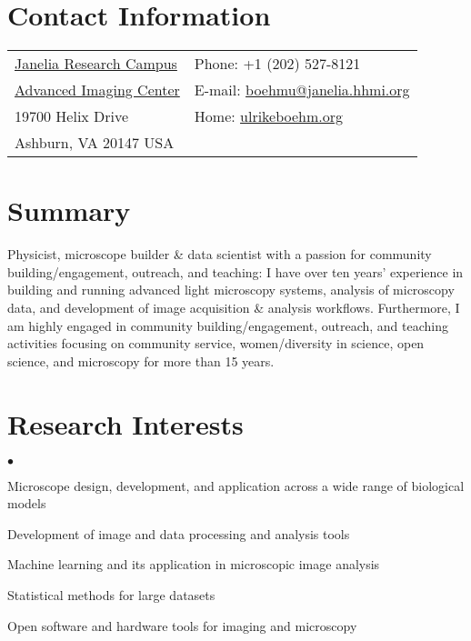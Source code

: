 \documentclass[margin,line]{res}
\newenvironment{list2}{
  \begin{list}{$\bullet$}{%
      \setlength{\itemsep}{0in}
      \setlength{\parsep}{0in} \setlength{\parskip}{0in}
      \setlength{\topsep}{0in} \setlength{\partopsep}{0in} 
      \setlength{\leftmargin}{0.2in}}}{\end{list}}
\begin{document}


\begin{resume}


\section{\sc Contact Information}
\vspace{.05in}
\begin{tabular}{@{}p{3.5in}p{4in}}
 \href{https://www.janelia.org/}{Janelia Research Campus}     & {Phone:} +1 (202) 527-8121 \\            
 \href{https://www.aicjanelia.org/}{Advanced Imaging Center}   & { E-mail:}   \href{mailto:boehmu@janelia.hhmi.org}{boehmu@janelia.hhmi.org}  \\         
19700 Helix Drive & { Home:}  \href{http://ulrikeboehm.org/}{ulrikeboehm.org}\\       
Ashburn, VA  20147 USA  &  \\     
\end{tabular}


\section{\sc Summary}
Physicist, microscope builder \& data scientist with a passion for community building/engagement, outreach, and teaching: I have over ten years’ experience in building and running advanced light microscopy systems, analysis of microscopy data, and development of image acquisition \& analysis workflows. Furthermore, I am highly engaged in community building/engagement, outreach, and teaching activities focusing on community service, women/diversity in science, open science, and microscopy for more than 15 years.


\section{\sc Research Interests}
\begin{list2}
\item Microscope design, development, and application across a wide range of biological models 
\item Development of image and data processing and analysis tools
\item Machine learning and its application in microscopic image analysis
\item Statistical methods for large datasets
\item Open software and hardware tools for imaging and microscopy
\end{list2}


\end{resume}
\end{document}
